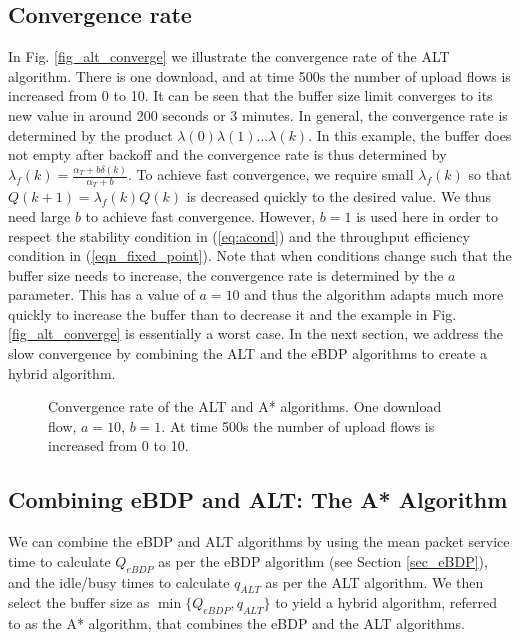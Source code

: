 \documentclass[10pt,twocolumn, journal]{IEEEtran}
\begin{document}
\subsection{Convergence rate}\label{subsec_convergence_rate}

In Fig. \ref{fig_alt_converge} we illustrate the convergence rate of the ALT algorithm.
There is one download, and at time 500s the number of upload flows is increased from 0 to
10. It can be seen that the buffer size limit converges to its new value in around 200
seconds or 3 minutes. In general, the convergence rate is determined by the product
$\lambda(0)\lambda(1)...\lambda(k)$. In this example, the buffer does not empty after
backoff and the convergence rate is thus determined by
$\lambda_f(k)=\frac{\alpha_T+b\delta(k)}{\alpha_T+b}$. To achieve fast convergence, we
require small $\lambda_f(k)$ so that $Q(k+1)=\lambda_f(k)Q(k)$ is decreased quickly to
the desired value. We thus need large $b$ to achieve fast convergence. However, $b=1$ is
used here in order to respect the stability condition in (\ref{eq:acond}) and the throughput efficiency condition in (\ref{eqn_fixed_point}).  Note that
when conditions change such that the buffer size needs to increase, the convergence rate
is determined by the $a$ parameter.  This has a value of $a=10$ and thus the algorithm
adapts much more quickly to increase the buffer than to decrease it and the example in
Fig. \ref{fig_alt_converge} is essentially a worst case.  In the next section, we address
the slow convergence by combining the ALT and the eBDP algorithms to create a hybrid algorithm.

\begin{figure}[tb]
   \centering
   \caption{Convergence rate of the ALT and A* algorithms.
   One download flow, $a=10$, $b=1$.
   At time 500s the number of upload flows is increased from 0 to 10.}
\end{figure}


\subsection{Combining eBDP and ALT: The A* Algorithm}\label{subsec_final}

We can combine the eBDP and ALT algorithms by using the mean packet service time to calculate $Q_{eBDP}$ as per the eBDP algorithm (see Section \ref{sec_eBDP}), and the idle/busy times to calculate $q_{ALT}$ as per the ALT algorithm.   We then select the buffer size as $\min\{Q_{eBDP},q_{ALT}\}$ to yield a hybrid  algorithm, referred to as the A* algorithm, that combines the eBDP and the ALT algorithms.
\end{document}
